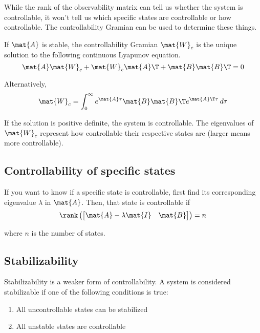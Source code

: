 While the rank of the observability matrix can tell us whether the system is
controllable, it won't tell us which specific states are controllable or how
controllable. The controllability Gramian can be used to determine these things.

If $\mat{A}$ is stable, the controllability Gramian $\mat{W}_c$ is the unique
solution to the following continuous Lyapunov equation.
\begin{equation}
  \mat{A}\mat{W}_c + \mat{W}_c\mat{A}\T + \mat{B}\mat{B}\T = 0
\end{equation}

Alternatively,
\begin{equation}
  \mat{W}_c =
    \int_0^\infty e^{\mat{A}\tau} \mat{B}\mat{B}\T e^{\mat{A}\T\tau} \,d\tau
\end{equation}

If the solution is positive definite, the system is controllable. The
eigenvalues of $\mat{W}_c$ represent how controllable their respective states
are (larger means more controllable).

\subsection{Controllability of specific states}

If you want to know if a specific state is controllable, first find its
corresponding eigenvalue $\lambda$ in $\mat{A}$. Then, that state is
controllable if
\begin{equation}
  \rank\left(
  \begin{bmatrix}
    \mat{A} - \lambda\mat{I} & \mat{B}
  \end{bmatrix}\right) = n
\end{equation}

where $n$ is the number of \glspl{state}.

\subsection{Stabilizability}

Stabilizability is a weaker form of controllability. A system is considered
stabilizable if one of the following conditions is true:
\begin{enumerate}
  \item All uncontrollable states can be stabilized
  \item All unstable states are controllable
\end{enumerate}


